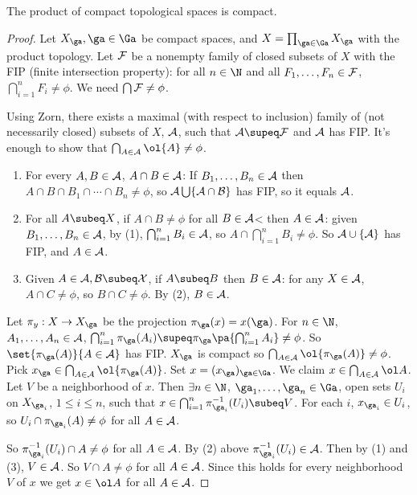 \begin{thm}
The product of compact topological spaces is compact.
\end{thm}
\begin{proof}
Let $X_{\ga},\ga\in \Ga$ be compact spaces, and $X=\prod_{\ga\in \Ga} X_{\ga}$ with the product topology. Let $\cal F$ be a nonempty family of closed subsets of $X$ with the FIP (finite intersection property): for all $n\in \N$ and all $F_1,\ldots, F_n\in \cal F$, $\bigcap_{i=1}^n F_i\ne \phi$. We need $\bigcap \cal F\ne \phi$.

Using Zorn, there exists a maximal (with respect to inclusion) family of (not necessarily closed) subsets of $X$, $\cal A$, such that $\cal A\supeq  F$ and $\cal A$ has FIP. It's enough to show that $\bigcap_{A\in \cal A}\ol{A}\ne \phi$. 
\begin{enumerate}
\item
For every $A,B\in \cal A$, $A\cap B\in \cal A$: If $B_1,\ldots, B_n\in \cal A$ then $A\cap B\cap B_1\cap \cdots \cap B_n\ne \phi$, so $\cal A\bigcup \{A\cap B\}$ has FIP, so it equals $\cal A$.
\item
For all $A\subeq X$, if $A\cap B\ne \phi$ for all $B\in \cal A$< then $A\in \cal A$: given $B_1,\ldots, B_n\in \cal A$, by (1), $\bigcap_{i=1}^n B_i\in \cal A$, so $A\cap \bigcap_{i=1}^n B_i\ne \phi$. So $\cal A\cup \{A\}$ has FIP, and $A\in \cal A$.
\item
Given $A\in \cal A,B\subeq X$, if $A\subeq B$ then $B\in \cal A$: for any $X\in \cal A$, $A\cap C\ne \phi$, so $B\cap C\ne \phi$. By (2), $B\in \cal A$.
\end{enumerate}
Let $\pi_y:X\to X_{\ga}$ be the projection $\pi_{\ga}(x)=x(\ga)$. For $n\in \N$, $A_1,\ldots, A_n\in \cal A$, $\bigcap_{i=1}^n \pi_{\ga}(A_i)\supeq \pi_{\ga}\pa{\bigcap_{i=1}^n A_i}\ne \phi$. So $\set{\pi_{\ga}(A)}{A\in \cal A}$ has FIP. $X_{\ga}$ is compact so $\bigcap_{A\in \cal A}\ol{\pi_{\ga}(A)}\ne \phi$. Pick $x_{\ga}\in \bigcap_{A\in \cal A}\ol{\pi_{\ga}(A)}$. Set $x=(x_{\ga})_{\ga\in \Ga}$. We claim $x\in \bigcap_{A\in \cal A}\ol A$. Let $V$ be a neighborhood of $x$. Then $\exists n\in \N$, $\ga_1,\ldots, \ga_n\in \Ga$, open sets $U_i$ on $X_{\ga_i}$, $1\le i\le n$, such that $x\in \bigcap_{i=1}^n \pi_{\ga_i}^{-1}(U_i)\subeq V$. For each $i$, $x_{\ga_i}\in U_i$, so $U_i\cap \pi_{\ga_i}(A)\ne \phi$ for all $A\in \cal A$.

So $\pi_{\ga_i}^{-1}(U_i)\cap A\ne \phi$ for all $A\in \cal A$. By (2) above $\pi_{\ga_i}^{-1}(U_i)\in \cal A$. Then by (1) and (3), $V\in \cal A$. So $V\cap A\ne \phi$ for all $A\in \cal A$. Since this holds for every neighborhood $V$ of $x$ we get $x\in \ol A$ for all $A\in \cal A$. 
\end{proof}

